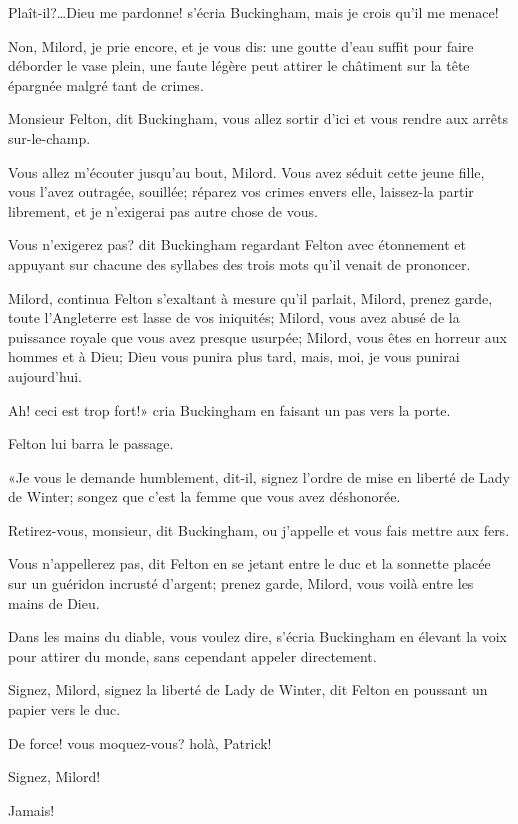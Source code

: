 \speak  Plaît-il?\dots Dieu me pardonne! s'écria Buckingham, mais je crois qu'il me menace! 

\speak  Non, Milord, je prie encore, et je vous dis: une goutte d'eau suffit pour faire déborder le vase plein, une faute légère peut attirer le châtiment sur la tête épargnée malgré tant de crimes. 

\speak  Monsieur Felton, dit Buckingham, vous allez sortir d'ici et vous rendre aux arrêts sur-le-champ. 

\speak  Vous allez m'écouter jusqu'au bout, Milord. Vous avez séduit cette jeune fille, vous l'avez outragée, souillée; réparez vos crimes envers elle, laissez-la partir librement, et je n'exigerai pas autre chose de vous. 

\speak  Vous n'exigerez pas? dit Buckingham regardant Felton avec étonnement et appuyant sur chacune des syllabes des trois mots qu'il venait de prononcer. 

\speak  Milord, continua Felton s'exaltant à mesure qu'il parlait, Milord, prenez garde, toute l'Angleterre est lasse de vos iniquités; Milord, vous avez abusé de la puissance royale que vous avez presque usurpée; Milord, vous êtes en horreur aux hommes et à Dieu; Dieu vous punira plus tard, mais, moi, je vous punirai aujourd'hui. 

\speak  Ah! ceci est trop fort!» cria Buckingham en faisant un pas vers la porte. 

Felton lui barra le passage. 

«Je vous le demande humblement, dit-il, signez l'ordre de mise en liberté de Lady de Winter; songez que c'est la femme que vous avez déshonorée. 

\speak  Retirez-vous, monsieur, dit Buckingham, ou j'appelle et vous fais mettre aux fers. 

\speak  Vous n'appellerez pas, dit Felton en se jetant entre le duc et la sonnette placée sur un guéridon incrusté d'argent; prenez garde, Milord, vous voilà entre les mains de Dieu. 

\speak  Dans les mains du diable, vous voulez dire, s'écria Buckingham en élevant la voix pour attirer du monde, sans cependant appeler directement. 

\speak  Signez, Milord, signez la liberté de Lady de Winter, dit Felton en poussant un papier vers le duc. 

\speak  De force! vous moquez-vous? holà, Patrick! 

\speak  Signez, Milord! 

\speak  Jamais! 

